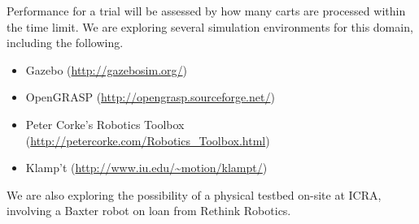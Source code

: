 \documentclass{amsart}
\theoremstyle{definition}
\begin{document}
Performance for a trial will be assessed by how many carts are processed within the time limit.
We are exploring several simulation environments for this domain, including the following.
\begin{itemize}
\item Gazebo (\url{http://gazebosim.org/})
\item OpenGRASP (\url{http://opengrasp.sourceforge.net/})
\item Peter Corke's Robotics Toolbox
(\url{http://petercorke.com/Robotics_Toolbox.html})
\item Klamp't (\url{http://www.iu.edu/~motion/klampt/})
\end{itemize}

We are also exploring the possibility of a physical testbed on-site at ICRA, involving a Baxter robot
on loan from Rethink Robotics.




\end{document}
